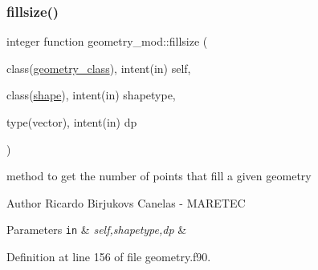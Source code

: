 \subsubsection{\texorpdfstring{fillsize()}{fillsize()}}
{\footnotesize\ttfamily integer function geometry\+\_\+mod\+::fillsize (\begin{DoxyParamCaption}\item[{class(\mbox{\hyperlink{structgeometry__mod_1_1geometry__class}{geometry\+\_\+class}}), intent(in)}]{self,  }\item[{class(\mbox{\hyperlink{structgeometry__mod_1_1shape}{shape}}), intent(in)}]{shapetype,  }\item[{type(vector), intent(in)}]{dp }\end{DoxyParamCaption})\hspace{0.3cm}{\ttfamily [private]}}



method to get the number of points that fill a given geometry 

\begin{DoxyAuthor}{Author}
Ricardo Birjukovs Canelas -\/ M\+A\+R\+E\+T\+EC 
\end{DoxyAuthor}

\begin{DoxyParams}[1]{Parameters}
\mbox{\tt in}  & {\em self,shapetype,dp} & \\
\hline
\end{DoxyParams}


Definition at line 156 of file geometry.\+f90.


